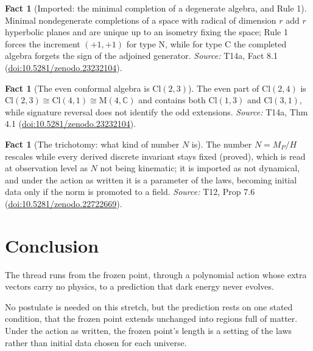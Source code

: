 \documentclass[11pt]{article}
\theoremstyle{definition}
\newtheorem{fact}[theorem]{Fact}
\theoremstyle{plain}
\providecommand{\C}{}\renewcommand{\C}{\mathbb{C}}
\providecommand{\Cl}{}\renewcommand{\Cl}{\mathrm{Cl}}
\providecommand{\Mat}{}\renewcommand{\Mat}{\mathrm{M}}
\begin{document}
\begin{fact}[Imported: the minimal completion of a degenerate algebra, and Rule 1]\label{c:odd-extensions.imported-minimal-completion-degenerate-algebra-rule}
Minimal nondegenerate completions of a space with radical of dimension $r$ add $r$ hyperbolic planes and are unique up to an isometry fixing the space; Rule 1 forces the increment $(+1,+1)$ for type N, while for type C the completed algebra forgets the sign of the adjoined generator.
\emph{Source:} T14a, Fact 8.1 (\href{https://doi.org/10.5281/zenodo.23232104}{doi:10.5281/zenodo.23232104}).
\end{fact}

\begin{fact}[The even conformal algebra is $\Cl(2,3)$]\label{c:odd-extensions.twistor-algebra}
The even part of $\Cl(2,4)$ is $\Cl(2,3) \cong \Cl(4,1) \cong \Mat(4, \C)$ and contains both $\Cl(1,3)$ and $\Cl(3,1)$, while signature reversal does not identify the odd extensions.
\emph{Source:} T14a, Thm 4.1 (\href{https://doi.org/10.5281/zenodo.23232104}{doi:10.5281/zenodo.23232104}).
\end{fact}

\begin{fact}[The trichotomy: what kind of number $N$ is]\label{c:standard-model.trichotomy-what-kind-number}
The number $N = M_{P}/H$ rescales while every derived discrete invariant stays fixed (proved), which is read at observation level as $N$ not being kinematic; it is imported as not dynamical, and under the action as written it is a parameter of the laws, becoming initial data only if the norm is promoted to a field.
\emph{Source:} T12, Prop 7.6 (\href{https://doi.org/10.5281/zenodo.22722669}{doi:10.5281/zenodo.22722669}).
\end{fact}

\section*{Conclusion}
The thread runs from the frozen point, through a polynomial action whose extra vectors carry no physics, to a prediction that dark energy never evolves.

No postulate is needed on this stretch, but the prediction rests on one stated condition, that the frozen point extends unchanged into regions full of matter. Under the action as written, the frozen point's length is a setting of the laws rather than initial data chosen for each universe.
\end{document}
